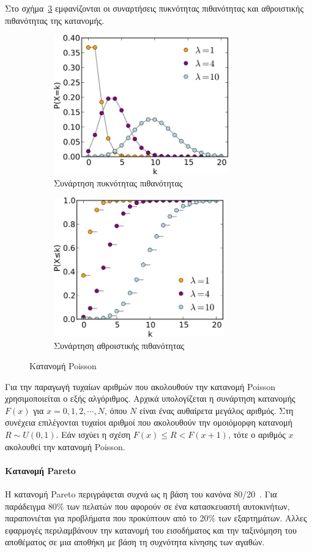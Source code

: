 \documentclass[12pt]{report}
\begin{document}
Στο σχήμα~\ref{fig:Poisson_Dist} εμφανίζονται οι συναρτήσεις πυκνότητας πιθανότητας και αθροιστικής πιθανότητας της κατανομής.
\begin{figure}[h]
\begin{subfigure}{0.5\textwidth}
\includegraphics[width=1.0\linewidth, height=6cm]{poisson_dist_pmf} 
\caption{Συνάρτηση πυκνότητας πιθανότητας}
\label{fig:Poisson_Dist_PMF}
\end{subfigure}
\begin{subfigure}{0.5\textwidth}
\includegraphics[width=1.0\linewidth, height=6cm]{poisson_dist_cdf}
\caption{Συνάρτηση αθροιστικής πιθανότητας}
\label{fig:Poisson_Dist_CDF}
\end{subfigure}
 
\caption{Κατανομή \textlatin{Poisson}}
\label{fig:Poisson_Dist}
\end{figure}

Για την παραγωγή τυχαίων αριθμών που ακολουθούν την κατανομή \textlatin{Poisson} χρησιμοποιείται ο εξής αλγόριθμος. Αρχικά υπολογίζεται η συνάρτηση κατανομής \(F(x)\) για \(x=0,1,2,\cdots,N\), όπου \(N\) είναι ένας αυθαίρετα μεγάλος αριθμός. Στη συνέχεια επιλέγονται τυχαίοι αριθμοί που ακολουθούν την ομοιόμορφη κατανομή \(R \sim U(0, 1)\). Εάν ισχύει η σχέση \(F(x) \leq R < F(x+1)\), τότε ο αριθμός \(x\) ακολουθεί την κατανομή \textlatin{Poisson}.

\paragraph{Κατανομή \textlatin{Pareto}}
Η κατανομή \textlatin{Pareto} περιγράφεται συχνά ως η βάση του κανόνα 80/20~\cite{book:07}. Για παράδειγμα 80\% των πελατών που αφορούν σε ένα κατασκευαστή αυτοκινήτων, παραπονιέται για προβλήματα που προκύπτουν από το 20\% των εξαρτημάτων. Αλλες εφαρμογές περιλαμβάνουν την κατανομή του εισοδήματος και την ταξινόμηση του αποθέματος σε μια αποθήκη με βάση τη συχνότητα κίνησης των αγαθών.
\end{document}
